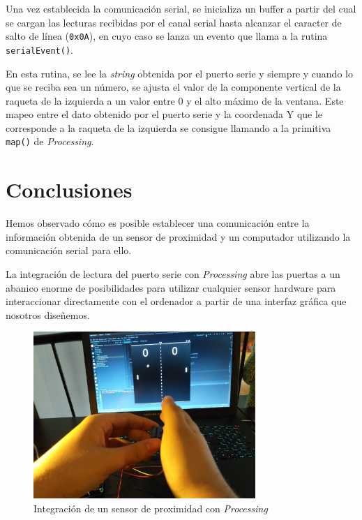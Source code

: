 \documentclass[10pt,a4paper]{report}
\begin{document}
	Una vez establecida la comunicación serial, se inicializa un buffer a partir del cual se cargan las lecturas recibidas por el canal serial hasta alcanzar el caracter de salto de línea (\texttt{0x0A}), en cuyo caso se lanza un evento que llama a la rutina \texttt{serialEvent()}.
	
	
	
	En esta rutina, se lee la \textit{string} obtenida por el puerto serie y siempre y cuando lo que se reciba sea un número, se ajusta el valor de la componente vertical de la raqueta de la izquierda a un valor entre 0 y el alto máximo de la ventana. Este mapeo entre el dato obtenido por el puerto serie y la coordenada Y que le corresponde a la raqueta de la izquierda se consigue llamando a la primitiva \texttt{map()} de \textit{Processing}.
	
	
	
	\chapter{Conclusiones}	
	Hemos observado cómo es posible establecer una comunicación entre la información obtenida de un sensor de proximidad y un computador utilizando la comunicación serial para ello.

	La integración de lectura del puerto serie con \textit{Processing} abre las puertas a un abanico enorme de posibilidades para utilizar cualquier sensor hardware para interaccionar directamente con el ordenador a partir de una interfaz gráfica que nosotros diseñemos.
	
	\begin{figure}[H]\label{fig:res1}
		\centering
		\includegraphics[width=0.75\textwidth]{project.jpeg}
		\caption{Integración de un sensor de proximidad con \textit{Processing}}
	\end{figure}
	
\end{document}
